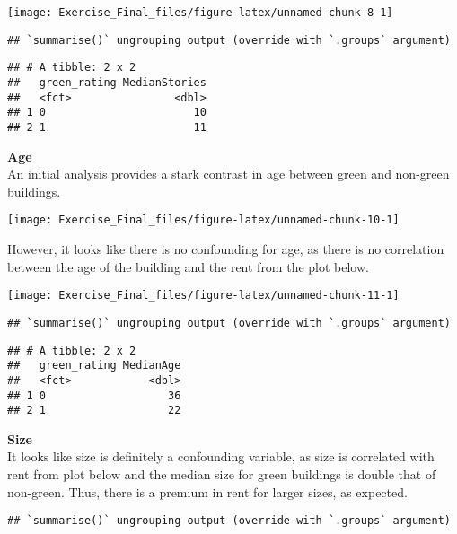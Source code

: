 \documentclass[
]{article}
\begin{document}
\begin{center}\texttt{[image: Exercise\_Final\_files/figure-latex/unnamed-chunk-8-1]} \end{center}

\begin{verbatim}
## `summarise()` ungrouping output (override with `.groups` argument)
\end{verbatim}

\begin{verbatim}
## # A tibble: 2 x 2
##   green_rating MedianStories
##   <fct>                <dbl>
## 1 0                       10
## 2 1                       11
\end{verbatim}

\textbf{Age}\\

An initial analysis provides a stark contrast in age between green and
non-green buildings.

\begin{center}\texttt{[image: Exercise\_Final\_files/figure-latex/unnamed-chunk-10-1]} \end{center}

However, it looks like there is no confounding for age, as there is no
correlation between the age of the building and the rent from the plot
below.

\begin{center}\texttt{[image: Exercise\_Final\_files/figure-latex/unnamed-chunk-11-1]} \end{center}

\begin{verbatim}
## `summarise()` ungrouping output (override with `.groups` argument)
\end{verbatim}

\begin{verbatim}
## # A tibble: 2 x 2
##   green_rating MedianAge
##   <fct>            <dbl>
## 1 0                   36
## 2 1                   22
\end{verbatim}

\textbf{Size}\\
It looks like size is definitely a confounding variable, as size is
correlated with rent from plot below and the median size for green
buildings is double that of non-green. Thus, there is a premium in rent
for larger sizes, as expected.

\begin{verbatim}
## `summarise()` ungrouping output (override with `.groups` argument)
\end{verbatim}
\end{document}
